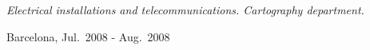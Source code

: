 \begin{description}[itemsep=15pt]
    \item[\href{http://sparkiberica.com}{Spark Ibérica}, Technical Assistant] \hfill

        \emph{Electrical installations and telecommunications. Cartography department.}

        Barcelona, Jul.\ 2008 - Aug.\ 2008

\end{description}